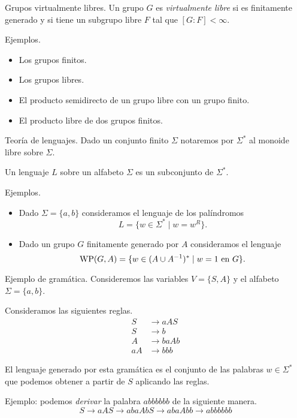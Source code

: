 \documentclass[aspectratio=169, 11pt]{beamer}
\begin{document}
	\begin{frame}[fragile]{Grupos virtualmente libres.}
		Un grupo $G$ es \emph{virtualmente libre} si es finitamente generado y si
		tiene un subgrupo libre $F$ tal que $[G:F] < \infty$.

		\begin{alertblock}{Ejemplos.}
			\begin{itemize}
				\item Los grupos finitos.
				\item Los grupos libres.
				\item El producto semidirecto de un grupo libre con un grupo finito.
				\item El producto libre de dos grupos finitos.
			\end{itemize}
		\end{alertblock}
	\end{frame}

	\begin{frame}[fragile]{Teoría de lenguajes.}
		Dado un conjunto finito $\Sigma$ notaremos por $\Sigma^*$ al monoide libre sobre $\Sigma$.
		
		Un lenguaje $L$ sobre un alfabeto $\Sigma$ es un subconjunto de $\Sigma^*$.
		\begin{alertblock}{Ejemplos.}
			\begin{itemize}
				\item 
					Dado $\Sigma = \{a,b\}$ consideramos el lenguaje de los palíndromos
					\[
						L = \{ w \in \Sigma^{*} \mid w = w^{R}  \}.
					\]
				\item 
					Dado un grupo $G$ finitamente generado por $A$ consideramos el lenguaje
					\[
						\text{WP}(G, A) = \{ w \in (A \cup A^{-1})^{*} \mid w = 1 \ \text{en $G$} \}.	
					\]
			\end{itemize}
		\end{alertblock}
	\end{frame}
	
	\begin{frame}[fragile]{Ejemplo de gramática.}
		Consideremos las variables $V =\{ S,A \}$ y el alfabeto $\Sigma = \{ a,b \}$.

		Consideramos las siguientes reglas.
		\begin{align*}
			S  & \to aAS  \\
			S  & \to b    \\
			A  & \to baAb \\
			aA & \to bbb
		\end{align*}

		El lenguaje generado por esta gramática es el conjunto de las palabras $w \in \Sigma^{*}$ que podemos obtener a partir de $S$ aplicando las reglas.

		Ejemplo: podemos \emph{derivar} la palabra $abbbbbb$ de la siguiente manera.  
		\[
			S \to aAS \to abaAbS \to abaAbb \to abbbbbb	
		\]
	\end{frame}
\end{document}
